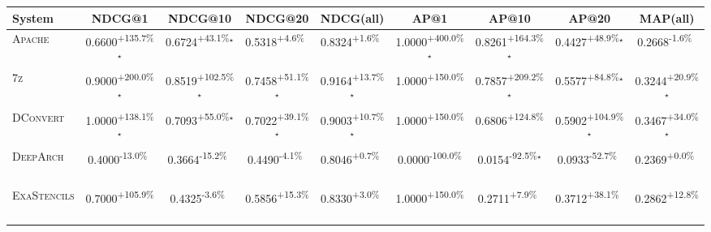 \begin{table}[htbp]
\centering
\renewcommand{\arraystretch}{1.2}
\begin{tabular}{l|cccc|cccc}
\hline
System & NDCG@1 & NDCG@10 & NDCG@20 & NDCG(all) & AP@1 & AP@10 & AP@20 & MAP(all) \\ \hline
\textsc{Apache} & \cellcolor{green!30}0.6600\textsuperscript{+135.7\%}$^\star$ & \cellcolor{green!30}0.6724\textsuperscript{+43.1\%}$^\star$ & \cellcolor{green!30}0.5318\textsuperscript{+4.6\%}$^{\,\,\,}$ & \cellcolor{green!30}0.8324\textsuperscript{+1.6\%}$^{\,\,\,}$ & \cellcolor{green!30}1.0000\textsuperscript{+400.0\%}$^\star$ & \cellcolor{green!30}0.8261\textsuperscript{+164.3\%}$^\star$ & \cellcolor{green!30}0.4427\textsuperscript{+48.9\%}$^\star$ & \cellcolor{red!30}0.2668\textsuperscript{-1.6\%}$^{\,\,\,}$ \\
\textsc{7z} & \cellcolor{green!30}0.9000\textsuperscript{+200.0\%}$^\star$ & \cellcolor{green!30}0.8519\textsuperscript{+102.5\%}$^\star$ & \cellcolor{green!30}0.7458\textsuperscript{+51.1\%}$^\star$ & \cellcolor{green!30}0.9164\textsuperscript{+13.7\%}$^\star$ & \cellcolor{green!30}1.0000\textsuperscript{+150.0\%}$^{\,\,\,}$ & \cellcolor{green!30}0.7857\textsuperscript{+209.2\%}$^\star$ & \cellcolor{green!30}0.5577\textsuperscript{+84.8\%}$^\star$ & \cellcolor{green!30}0.3244\textsuperscript{+20.9\%}$^\star$ \\
\textsc{DConvert} & \cellcolor{green!30}1.0000\textsuperscript{+138.1\%}$^\star$ & \cellcolor{green!30}0.7093\textsuperscript{+55.0\%}$^\star$ & \cellcolor{green!30}0.7022\textsuperscript{+39.1\%}$^\star$ & \cellcolor{green!30}0.9003\textsuperscript{+10.7\%}$^\star$ & \cellcolor{green!30}1.0000\textsuperscript{+150.0\%}$^{\,\,\,}$ & \cellcolor{green!30}0.6806\textsuperscript{+124.8\%}$^{\,\,\,}$ & \cellcolor{green!30}0.5902\textsuperscript{+104.9\%}$^\star$ & \cellcolor{green!30}0.3467\textsuperscript{+34.0\%}$^\star$ \\
\textsc{DeepArch} & \cellcolor{red!30}0.4000\textsuperscript{-13.0\%}$^{\,\,\,}$ & \cellcolor{red!30}0.3664\textsuperscript{-15.2\%}$^{\,\,\,}$ & \cellcolor{red!30}0.4490\textsuperscript{-4.1\%}$^{\,\,\,}$ & \cellcolor{green!30}0.8046\textsuperscript{+0.7\%}$^{\,\,\,}$ & \cellcolor{red!30}0.0000\textsuperscript{-100.0\%}$^{\,\,\,}$ & \cellcolor{red!30}0.0154\textsuperscript{-92.5\%}$^\star$ & \cellcolor{red!30}0.0933\textsuperscript{-52.7\%}$^{\,\,\,}$ & \cellcolor{green!30}0.2369\textsuperscript{+0.0\%}$^{\,\,\,}$ \\
\textsc{ExaStencils} & \cellcolor{green!30}0.7000\textsuperscript{+105.9\%}$^{\,\,\,}$ & \cellcolor{red!30}0.4325\textsuperscript{-3.6\%}$^{\,\,\,}$ & \cellcolor{green!30}0.5856\textsuperscript{+15.3\%}$^{\,\,\,}$ & \cellcolor{green!30}0.8330\textsuperscript{+3.0\%}$^{\,\,\,}$ & \cellcolor{green!30}1.0000\textsuperscript{+150.0\%}$^{\,\,\,}$ & \cellcolor{green!30}0.2711\textsuperscript{+7.9\%}$^{\,\,\,}$ & \cellcolor{green!30}0.3712\textsuperscript{+38.1\%}$^{\,\,\,}$ & \cellcolor{green!30}0.2862\textsuperscript{+12.8\%}$^{\,\,\,}$ \\

\end{tabular}
\end{table}
